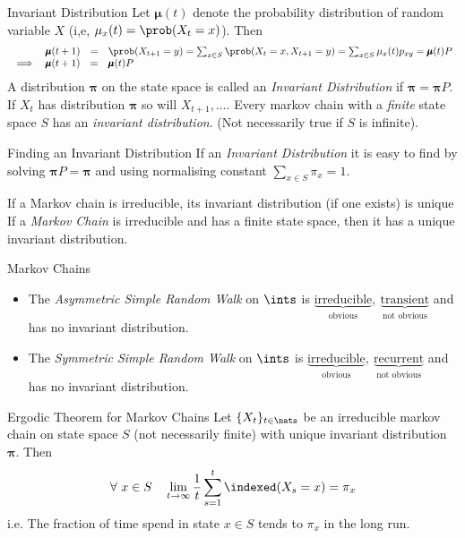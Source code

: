 \documentclass[11pt,a4paper]{article}
\begin{document}
  \begin{definition}{Invariant Distribution}
    Let $\pmb\mu(t)$ denote the probability distribution of random variable $X$ (i,e, $\mu_x(t)=\prob(X_t=x)$). Then
    \[\begin{array}{rrcl}
      &\pmb\mu(t+1)&=&\prob(X_{t+1}=y)=\sum_{x\in S}\prob(X_t=x,X_{t+1}=y)=\sum_{x\in S}\mu_x(t)p_{xy}=\pmb\mu(t)P\\
      \implies&\pmb\mu(t+1)&=&\pmb\mu(t)P
    \end{array}\]
    A distribution $\pmb\pi$ on the state space is called an \textit{Invariant Distribution} if $\pmb\pi=\pmb\pi P$. If $X_t$ has distribution $\pmb\pi$ so will $X_{t+1},\dots$. Every markov chain with a \textit{finite} state space $S$ has an \textit{invariant distribution}. (Not necessarily true if $S$ is infinite).
  \end{definition}

  \begin{proposition}{Finding an Invariant Distribution}
    If an \textit{Invariant Distribution} it is easy to find by solving $\pmb\pi P=\pmb\pi$ and using normalising constant $\sum_{x\in S}\pi_x=1$.
  \end{proposition}

  \begin{remark}{If a Markov chain is irreducible, its invariant distribution (if one exists) is unique}
    If a \textit{Markov Chain} is irreducible and has a finite state space, then it has a unique invariant distribution.
  \end{remark}

  \begin{example}{Markov Chains}
    \begin{itemize}
      \item The \textit{Asymmetric Simple Random Walk} on $\ints$ is $\underbrace{\text{irreducible}}_\text{obvious},\ \underbrace{\text{transient}}_\text{not obvious}$ and has no invariant distribution.
      \item The \textit{Symmetric Simple Random Walk} on $\ints$ is $\underbrace{\text{irreducible}}_\text{obvious},\ \underbrace{\text{recurrent}}_\text{not obvious}$ and has no invariant distribution.
    \end{itemize}
  \end{example}

  \begin{theorem}{Ergodic Theorem for Markov Chains}
    Let $\{X_t\}_{t\in\nats}$ be an irreducible markov chain on state space $S$ (not necessarily finite) with unique invariant distribution $\pmb\pi$. Then
    \[ \forall\ x\in S\quad\lim_{t\to\infty}\frac1t\sum_{s=1}^t \indexed(X_s=x)=\pi_x\]
    i.e. The fraction of time spend in state $x\in S$ tends to $\pi_x$ in the long run.
  \end{theorem}
\end{document}

